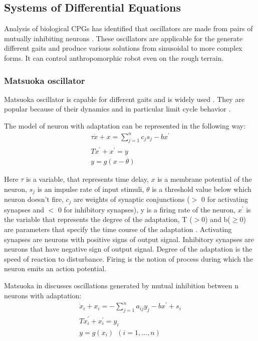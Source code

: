 \documentclass[12pt,a4paper]{report}
\begin{document}
		\subsection{Systems of Differential Equations}
			Analysis of biological CPGs has identified that oscillators are made from pairs of mutually inhibiting neurons \cite{grillner1995neural}. These oscillators are applicable for the  generate different gaits and produce various solutions from sinusoidal to more complex forms. It can control anthropomorphic robot even on the rough terrain.
			\subsubsection{Matsuoka oscillator}
				Matsuoka oscillator is capable for different gaits and is widely used \cite{wright2014intelligent}. They are popular because of their dynamics and in particular limit cycle behavior \cite{matsuoka1985sustained}.
				
				The model of neuron with adaptation can be represented in the following way:
				\begin{equation}\label{eq:Mats1}
					\begin{split}
						\tau \dot{x} + x = \sum^n_{j = 1} c_j s_j - b x^{\prime}\\
						T \dot{x}^{\prime}  + x^{\prime} = y\\
						y = g(x - \theta)
					\end{split}
				\end{equation}
				
				Here $\tau$ is a variable, that represents time delay, $x$ is a membrane potential of the neuron, $s_j$ is an impulse rate of input stimuli, $\theta$ is a threshold value below which neuron doesn't fire, $c_j$ are weights of synaptic conjunctions ($>$ 0 for activating synapses and $<$ 0 for inhibitory synapses), y is a firing rate of the neuron, $x^{\prime}$ is the variable that represents the degree of the adaptation, T ($>$0) and b($\geq 0$) are parameters that specify the time course of the adaptation \cite{matsuoka1985sustained}.
				Activating synapses are neurons with positive signs of output signal.
				Inhibitory synapses are neurons that have negative sign of output signal.
				Degree of the adaptation is the speed of reaction to disturbance. Firing is the notion of process during which the neuron emits an action potential. 
				
				Matsuoka in \cite{matsuoka1985sustained} discusses oscillations generated by mutual inhibition between n neurons with adaptation:
				\begin{equation}\label{eq:Mats2}
					\begin{split}
						\dot{x}_i + x_i = - \sum^n_{j = 1} a_{ij} y_j - b x^{\prime} + s_i\\
						T \dot{x}^{\prime}_i  + x^{\prime}_i= y_i\\
						y = g(x_i)\ \ (i = 1,...,n) 
					\end{split}
				\end{equation}
				
\end{document}
